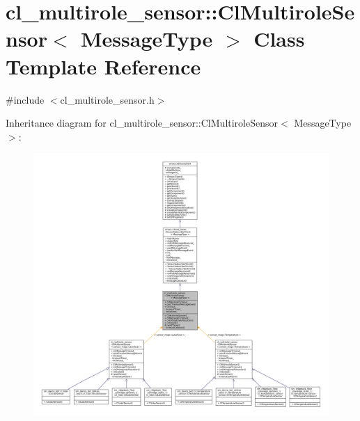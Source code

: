 \hypertarget{classcl__multirole__sensor_1_1ClMultiroleSensor}{}\section{cl\+\_\+multirole\+\_\+sensor\+:\+:Cl\+Multirole\+Sensor$<$ Message\+Type $>$ Class Template Reference}
\label{classcl__multirole__sensor_1_1ClMultiroleSensor}


{\ttfamily \#include $<$cl\+\_\+multirole\+\_\+sensor.\+h$>$}



Inheritance diagram for cl\+\_\+multirole\+\_\+sensor\+:\+:Cl\+Multirole\+Sensor$<$ Message\+Type $>$\+:
\nopagebreak
\begin{figure}[H]
\begin{center}
\leavevmode
\includegraphics[width=350pt]{classcl__multirole__sensor_1_1ClMultiroleSensor__inherit__graph}
\end{center}
\end{figure}


